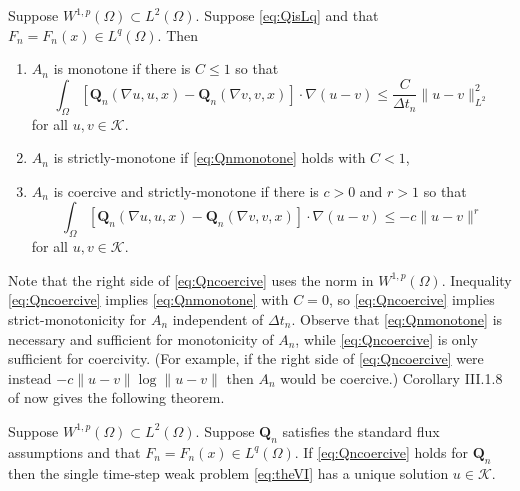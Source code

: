 \documentclass[final,onefignum]{siamart190516}
\newcommand\bQ{\mathbf{Q}}
\newcommand{\grad}{\nabla}
\begin{document}
\begin{lemma}  \label{lem:monotonecoercive}  Suppose $W^{1,p}(\Omega) \subset L^2(\Omega)$.  Suppose \eqref{eq:QisLq} and that $F_n=F_n(x) \in L^q(\Omega)$.  Then
\renewcommand{\labelenumi}{(\roman{enumi})}
\begin{enumerate}
\item  $A_n$ is monotone if there is $C\le 1$ so that
\begin{equation}
\int_\Omega \left[\bQ_n(\grad u,u,x) - \bQ_n(\grad v,v,x)\right] \cdot \grad(u-v) \le \frac{C}{\Delta t_n} \|u-v\|_{L^2}^2 \label{eq:Qnmonotone}
\end{equation}
for all $u,v \in \mathcal{K}$.
\item  $A_n$ is strictly-monotone if \eqref{eq:Qnmonotone} holds with $C<1$,
\item  $A_n$ is coercive and strictly-monotone if there is $c>0$ and $r>1$ so that
\begin{equation}
\int_\Omega \left[\bQ_n(\grad u,u,x) - \bQ_n(\grad v,v,x)\right] \cdot \grad(u-v) \le - c \|u-v\|^r \label{eq:Qncoercive}
\end{equation}
for all $u,v \in \mathcal{K}$.
\end{enumerate}
\end{lemma}

Note that the right side of \eqref{eq:Qncoercive} uses the norm in $W^{1,p}(\Omega)$.  Inequality \eqref{eq:Qncoercive} implies \eqref{eq:Qnmonotone} with $C=0$, so \eqref{eq:Qncoercive} implies strict-monotonicity for $A_n$ independent of $\Delta t_n$.  Observe that \eqref{eq:Qnmonotone} is necessary and sufficient for monotonicity of $A_n$, while \eqref{eq:Qncoercive} is only sufficient for coercivity.  (For example, if the right side of \eqref{eq:Qncoercive} were instead $- c \|u-v\| \log \|u-v\|$ then $A_n$ would be coercive.)  Corollary III.1.8 of \cite{KinderlehrerStampacchia1980} now gives the following theorem.

\begin{theorem}  \label{thm:monowellposed}  Suppose $W^{1,p}(\Omega) \subset L^2(\Omega)$.  Suppose $\bQ_n$ satisfies the standard flux assumptions and that $F_n=F_n(x)\in L^q(\Omega)$.  If \eqref{eq:Qncoercive} holds for $\bQ_n$ then the single time-step weak problem \eqref{eq:theVI} has a unique solution $u\in\mathcal{K}$.
\end{theorem}
\end{document}
